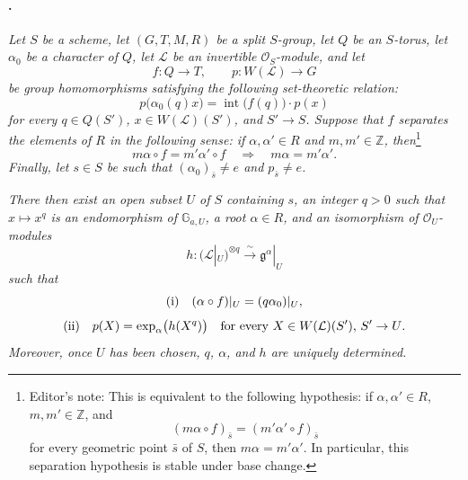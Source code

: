 \paragraph{.}
\textit{Let \(S\) be a scheme, let \((G,T,M,R)\) be a split
\(S\)-group, let \(Q\) be an \(S\)-torus, let \(\alpha_0\) be a
character of \(Q\), let \(\mathcal L\) be an invertible
\(\mathcal O_S\)-module, and let}
\[
  f:Q\longrightarrow T,
  \qquad
  p:W(\mathcal L)\longrightarrow G
\]
\textit{be group homomorphisms satisfying the following
set-theoretic relation:}
\[
  p\bigl(\alpha_0(q)x\bigr)
  =
  \operatorname{int}\bigl(f(q)\bigr)\mathbin{\cdot}p(x)
\]
\textit{for every \(q\in Q(S')\), \(x\in W(\mathcal L)(S')\), and
\(S'\to S\). Suppose that \(f\) separates the elements of \(R\) in
the following sense: if \(\alpha,\alpha'\in R\) and
\(m,m'\in\mathbb Z\), then}\footnote{Editor's note: This is
equivalent to the following hypothesis: if
\(\alpha,\alpha'\in R\), \(m,m'\in\mathbb Z\), and
\[
  (m\alpha\circ f)_{\bar s}
  =
  (m'\alpha'\circ f)_{\bar s}
\]
for every geometric point \(\bar s\) of \(S\), then
\(m\alpha=m'\alpha'\). In particular, this separation hypothesis is
stable under base change.}
\[
  m\alpha\circ f=m'\alpha'\circ f
  \quad\Longrightarrow\quad
  m\alpha=m'\alpha'.
\]
\textit{Finally, let \(s\in S\) be such that
\((\alpha_0)_{\bar s}\ne e\) and \(p_{\bar s}\ne e\).}

\textit{There then exist an open subset \(U\) of \(S\) containing
\(s\), an integer \(q>0\) such that \(x\mapsto x^q\) is an
endomorphism of \(\mathbb G_{a,U}\), a root \(\alpha\in R\), and an
isomorphism of \(\mathcal O_U\)-modules}
\[
  h:(\mathcal L|_U)^{\otimes q}
  \xrightarrow{\;\sim\;}
  \mathfrak g^\alpha|_U
\]
\textit{such that}
\[
  \textup{(i)}\quad
  (\alpha\circ f)|_U=(q\alpha_0)|_U,
\]
\[
  \textup{(ii)}\quad
  p(X)=\exp_\alpha\bigl(h(X^q)\bigr)
  \quad\textup{for every \(X\in W(\mathcal L)(S')\), \(S'\to U\).}
\]
\textit{Moreover, once \(U\) has been chosen, \(q\), \(\alpha\),
and \(h\) are uniquely determined.}


